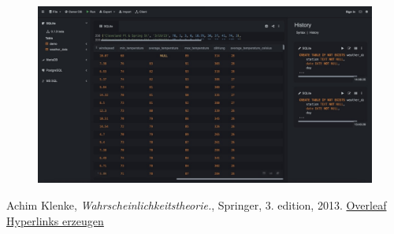 \documentclass{article}
\begin{document}
\begin{figure}
    \centering
    \includegraphics[width=0.5\linewidth]{Bild4.jpeg}
    \caption{}
    \label{Abb4}
\end{figure}

\newpage
\renewcommand{\refname}{Literatur}
\begin{thebibliography}{9}
    Achim Klenke,
    \textit{Wahrscheinlichkeitstheorie.},
    Springer, 3. edition, 
    2013.
\href{https://de.overleaf.com/learn/latex/Hyperlinks}{Overleaf Hyperlinks erzeugen}
\end{thebibliography}
\end{document}
